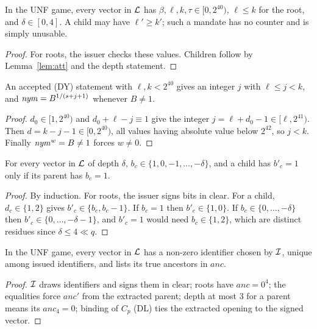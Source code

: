 \begin{lemma}[Bounds]\label{lem:bounds}
In the UNF game, every vector in $\mathcal{L}$ has $\beta,\ell,k,\tau\in[0,2^{40})$, $\ell\le k$ for the root, and $\delta\in[0,4]$. A child may have $\ell'\ge k'$; such a mandate has no counter and is simply unusable.
\end{lemma}
\begin{proof}
For roots, the issuer checks these values. Children follow by Lemma~\ref{lem:att} and the depth statement.
\end{proof}

\begin{lemma}[Counter]\label{lem:ctr}
An accepted (DY) statement with $\ell,k<2^{40}$ gives an integer $j$ with $\ell\le j<k$, and $\mathit{nym}=B^{1/(s+j+1)}$ whenever $B\neq1$.
\end{lemma}
\begin{proof}
$d_0\in[1,2^{40})$ and $d_0+\ell-j\equiv1$ give the integer $j=\ell+d_0-1\in[\ell,2^{41})$. Then $d=k-j-1\in[0,2^{40})$, all values having absolute value below $2^{42}$, so $j<k$. Finally $\mathit{nym}^{w}=B\neq1$ forces $w\neq0$.
\end{proof}

\begin{lemma}\label{lem:scope}
For every vector in $\mathcal{L}$ of depth $\delta$, $b_c\in\{1,0,-1,\dots,-\delta\}$, and a child has $b'_c=1$ only if its parent has $b_c=1$.
\end{lemma}
\begin{proof}
By induction. For roots, the issuer signs bits in clear. For a child, $d_c\in\{1,2\}$ gives $b'_c\in\{b_c,b_c-1\}$. If $b_c=1$ then $b'_c\in\{1,0\}$. If $b_c\in\{0,\dots,-\delta\}$ then $b'_c\in\{0,\dots,-\delta-1\}$, and $b'_c=1$ would need $b_c\in\{1,2\}$, which are distinct residues since $\delta\le4\ll q$.
\end{proof}

\begin{lemma}\label{lem:anc}
In the UNF game, every vector in $\mathcal{L}$ has a non-zero identifier chosen by $\mathcal{I}$, unique among issued identifiers, and lists its true ancestors in $\mathit{anc}$.
\end{lemma}
\begin{proof}
$\mathcal{I}$ draws identifiers and signs them in clear; roots have $\mathit{anc}=0^4$; the equalities force $\mathit{anc}'$ from the extracted parent; depth at most 3 for a parent means its $\mathit{anc}_4=0$; binding of $C_p$ (DL) ties the extracted opening to the signed vector.
\end{proof}

